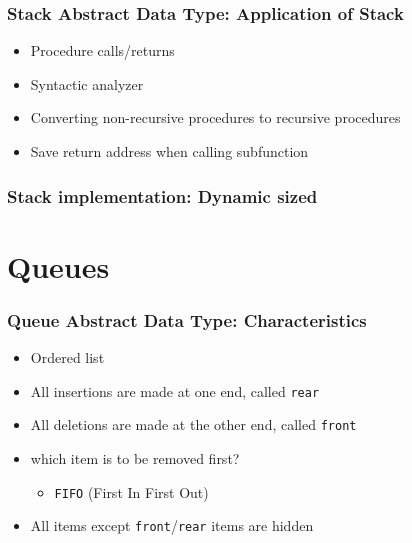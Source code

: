 \documentclass[newPxFont,sthlmFooter,nooffset]{beamer}
\begin{document}
\begin{frame}[t]
  \frametitle{Stack Abstract Data Type: Application of Stack}
  \begin{itemize}
  \item Procedure calls/returns
  \item Syntactic analyzer
  \item Converting non-recursive procedures to recursive procedures
  \item Save return address when calling subfunction
  \end{itemize}
\end{frame}


\begin{frame}
  \frametitle{Stack implementation: Dynamic sized}

  

\end{frame}



\section{Queues} 
\begin{frame}[t]
  \frametitle{Queue Abstract Data Type: Characteristics}
  \begin{itemize}
  \item Ordered list
  \item All insertions are made at one end, called \texttt{rear}
  \item All deletions are made at the other end, called \texttt{front}
  \item which item is to be removed first?
    \begin{itemize}
    \item \texttt{FIFO} (First In First Out)
    \end{itemize}
  \item All items except \texttt{front}/\texttt{rear} items are hidden
  \end{itemize}
\end{frame}
\end{document}
